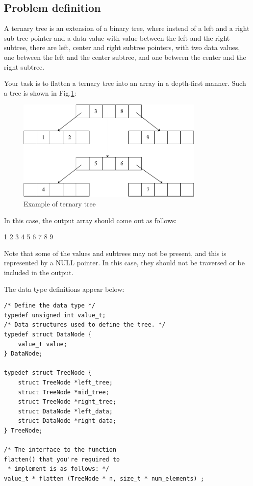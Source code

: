 \documentclass[runningheads,a4paper]{llncs}
\begin{document}
\subsection{Problem definition}

A ternary tree is an extension of a binary tree, where instead of a left
and a right sub-tree pointer and a data value with value between the left
and the right subtree, there are left, center and right subtree pointers,
with two data values, one between the left and the center subtree, and one
between the center and the right subtree.

Your task is to flatten a ternary tree into an array in a depth-first
manner.
Such a tree is shown in Fig.\ref{fig_tree3}:

\begin{figure}
\centering
\includegraphics[width=9.2cm]{fig_tree3}
\caption{Example of ternary tree}
\label{fig_tree3}
\end{figure}

In this case, the output array should come out as follows:

1 2 3 4 5 6 7 8 9

Note that some of the values and subtrees may not be present, and this is
represented by a NULL pointer.  In this case, they should not be traversed
or be included in the output.

The data type definitions appear below:

\begin{lstlisting}
/* Define the data type */
typedef unsigned int value_t;
/* Data structures used to define the tree. */
typedef struct DataNode {
	value_t value;
} DataNode;

typedef struct TreeNode {
	struct TreeNode *left_tree;
	struct TreeNode *mid_tree;
	struct TreeNode *right_tree;
	struct DataNode *left_data;
	struct DataNode *right_data;
} TreeNode;

/* The interface to the function
flatten() that you're required to
 * implement is as follows: */
value_t * flatten (TreeNode * n, size_t * num_elements) ;
\end{lstlisting}
\end{document}
